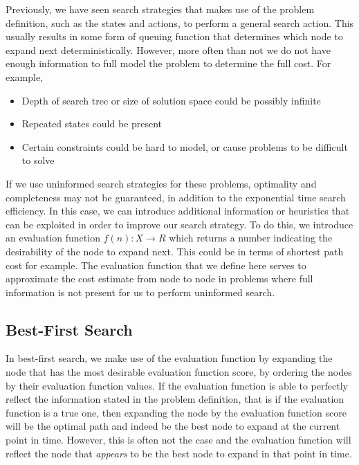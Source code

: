 \documentclass[12pt]{article}
\begin{document}
Previously, we have seen search strategies that makes use of the problem definition, such as the states and actions, to perform a general search action. This usually results in some form of queuing function that determines which node to expand next deterministically. However, more often than not we do not have enough information to full model the problem to determine the full cost. For example,

\begin{itemize}
\item Depth of search tree or size of solution space could be possibly infinite
\item Repeated states could be present
\item Certain constraints could be hard to model, or cause problems to be difficult to solve
\end{itemize}

If we use uninformed search strategies for these problems, optimality and completeness may not be guaranteed, in addition to the exponential time search efficiency. In this case, we can introduce additional information or heuristics that can be exploited in order to improve our search strategy. To do this, we introduce an evaluation function $f(n): X \rightarrow R$ which returns a number indicating the desirability of the node to expand next. This could be in terms of shortest path cost for example. The evaluation function that we define here serves to approximate the cost estimate from node to node in problems where full information is not present for us to perform uninformed search.

\subsection{Best-First Search}

In best-first search, we make use of the evaluation function by expanding the node that has the most desirable evaluation function score, by ordering the nodes by their evaluation function values. If the evaluation function is able to perfectly reflect the information stated in the problem definition, that is if the evaluation function is a true one, then expanding the node by the evaluation function score will be the optimal path and indeed be the best node to expand at the current point in time. However, this is often not the case and the evaluation function will reflect the node that \textit{appears} to be the best node to expand in that point in time.\\
\end{document}
